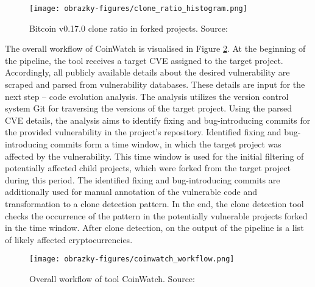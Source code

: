     \begin{figure}[h]
      \centering
      \texttt{[image: obrazky-figures/clone\_ratio\_histogram.png]}
      \caption{Bitcoin v0.17.0 clone ratio in forked projects. Source:~\cite{CoinWatch}}
      \label{bitcoin-clone-ratio}
    \end{figure}

    The overall workflow of CoinWatch is visualised in Figure \ref{coinwatch-workflow}. At the beginning
    of the pipeline, the tool receives a target CVE assigned to the target project. Accordingly, all publicly
    available details about the desired vulnerability are scraped and parsed from vulnerability databases.
    These details are input for the next step -- code evolution analysis. The analysis utilizes the version
    control system Git for traversing the versions of the target project. Using the parsed CVE details,
    the analysis aims to identify fixing and bug-introducing commits for the provided vulnerability
    in the project's repository. Identified fixing and bug-introducing commits form a time window, in which
    the target project was affected by the vulnerability. This time window is used for the initial filtering
    of potentially affected child projects, which were forked from the target project during this period.
    The identified fixing and bug-introducing commits are additionally used for manual annotation of
    the vulnerable code and transformation to a clone detection pattern. In the end, the clone detection tool
    checks the occurrence of the pattern in the potentially vulnerable projects forked in the time window.
    After clone detection, on the output of the pipeline is a list of likely affected cryptocurrencies.

    \begin{figure}[h]
      \centering
      \texttt{[image: obrazky-figures/coinwatch\_workflow.png]}
      \caption{Overall workflow of tool CoinWatch. Source:~\cite{CoinWatch}}
      \label{coinwatch-workflow}
    \end{figure}

